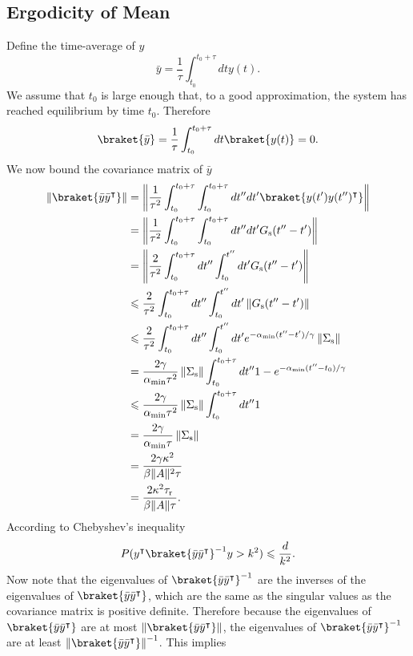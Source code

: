 \documentclass[prx,onecolumn,floatfix,longbibliography,notitlepage, nofootinbib,12pt]{revtex4-2}
\renewcommand{\leq}{\leqslant}
\begin{document}
\begin{appendix}
\subsection{Ergodicity of Mean}

Define the time-average of $y$
\begin{equation}
\bar{y} = \frac{1}{\tau} \int_{t_0}^{t_0 + \tau} dt y(t).
\end{equation}
We assume that $t_0$ is large enough that, to a good approximation, the system has reached equilibrium by time $t_0$. Therefore
\begin{equation}
\braket{\bar{y}} = \frac{1}{\tau} \int_{t_0}^{t_0 + \tau} dt \braket{y(t)} = 0.
\end{equation}
We now bound the covariance matrix of $\bar{y}$
\begin{align}
\left\|\braket{\bar{y}\bar{y}^\intercal}\right\| &=\left \| \frac{1}{\tau^2}\int_{t_0}^{t_0+\tau}\int_{t_0}^{t_0+\tau} dt''dt' \braket{y(t')y(t'')^\intercal}\right \| \\
&=  \left\|\frac{1}{\tau^2}\int_{t_0}^{t_0+\tau}\int_{t_0}^{t_0+\tau}  dt''dt' G_\text{s}(t''-t') \right\|\\
&=  \left\|\frac{2}{\tau^2}\int_{t_0}^{t_0 + \tau}dt''\int_{t_0}^{t''} dt' G_\text{s}(t''-t') \right\|\\
&\leq 
\frac{2}{\tau^2}\int_{t_0}^{t_0 + \tau}dt''\int_{t_0}^{t''} dt' \left\|G_\text{s}(t''-t') \right\|\\
&\leq 
\frac{2}{\tau^2}\int_{t_0}^{t_0 + \tau}dt''\int_{t_0}^{t''} dt' e^{-\alpha_\text{min}(t''-t')/\gamma} \left\| \Sigma_\text{s}\right\|\\
&=
\frac{2\gamma}{\alpha_\text{min}\tau^2} \left\| \Sigma_\text{s}\right\|\int_{t_0}^{t_0 + \tau}dt'' 1-e^{-\alpha_\text{min}(t'' - t_0)/\gamma} \\
& \leq 
 \frac{2\gamma}{\alpha_\text{min}\tau^2} \left\| \Sigma_\text{s}\right\|\int_{t_0}^{t_0 + \tau}dt''1 \\
 &= 
 \frac{2\gamma}{\alpha_\text{min}\tau} \left\| \Sigma_\text{s}\right\|
 \\ & = \frac{2 \gamma \kappa^2}{\beta\|A\|^2\tau}\\
 & =  \frac{2  \kappa^2 \tau_\text{r}}{\beta\|A\|\tau}.
\end{align}
According to Chebyshev's inequality
\begin{equation}
    P(y^\intercal \braket{\bar{y} \bar{y}^\intercal}^{-1} y > k^2 ) \leq \frac{d}{k^2}.
\end{equation}
Now note that the eigenvalues of $\braket{\bar{y} \bar{y}^\intercal}^{-1}$ are the inverses of the eigenvalues of $\braket{\bar{y} \bar{y}^\intercal}$, which are the same as the singular values as the covariance matrix is positive definite. Therefore because the eigenvalues of $\braket{\bar{y} \bar{y}^\intercal}$ are at most $\left\|\braket{\bar{y}\bar{y}^\intercal}\right\|$, the eigenvalues of $\braket{\bar{y} \bar{y}^\intercal}^{-1}$ are at least $ \left\|\braket{\bar{y}\bar{y}^\intercal}\right\| ^{-1}$. This implies

\end{appendix}
\end{document}
